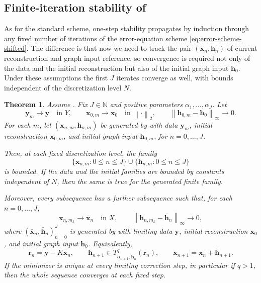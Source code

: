 \documentclass{article}
\newtheorem{theorem}{Theorem}[section]
\theoremstyle{remark}
\newcommand{\N}{\mathbb{N}}
\newcommand{\norm}[1]{\left\lVert #1 \right\rVert}
\newcommand{\bx}{{\bm{x}}}
\newcommand{\by}{{\bm{y}}}
\newcommand{\bh}{{\bm{h}}}
\newcommand{\br}{{\bm{r}}}
\begin{document}
\subsection{Finite-iteration stability of \texorpdfstring{}{the error-equation scheme}}\label{sec:error-finite-stability}
As for the standard scheme, one-step stability propagates by induction through
any fixed number of iterations of the error-equation scheme
\cref{eq:error-scheme-shifted}. The difference is that now we need to track the pair
$(\bx_n,\bh_n)$ of current reconstruction and graph input reference, so convergence is
required not only of the data and the initial reconstruction but also of the
initial graph input $\bh_0$. Under these assumptions the first $J$ iterates
converge as well, with bounds independent of the discretization level $N$.
\begin{theorem}\label{thm:error-finite-stability}
Assume . Fix \(J\in\N\) and positive parameters
\(\alpha_1,\ldots,\alpha_J\). Let
\[
\by_m\to \by \quad\text{in }Y,
\qquad
\bx_{0,m}\to \bx_0 \quad\text{in }\norm{\cdot}_2,
\qquad
\norm{\bh_{0,m}-\bh_0}_\infty\to0 .
\]
For each \(m\), let \((\bx_{n,m},\bh_{n,m})\) be generated by
 with data \(\by_m\), initial reconstruction
\(\bx_{0,m}\), and initial graph input \(\bh_{0,m}\), for
\(n=0,\ldots,J\).

Then, at each fixed discretization level, the family
\[
\{\bx_{n,m}:0\le n\le J\}\cup\{\bh_{n,m}:0\le n\le J\}
\]
is bounded. If the data and the initial families are bounded by constants
independent of \(N\), then the same is true for the generated finite family.

Moreover, every subsequence has a further subsequence such that, for each
\(n=0,\ldots,J\),
\[
\bx_{n,m_k}\to \bar\bx_n \quad\text{in } X,
\qquad
\norm{\bh_{n,m_k}-\bar\bh_n}_\infty\to0,
\]
where \((\bar\bx_n,\bar\bh_n)_{n=0}^J\) is generated by
 with limiting data \(\by\), initial reconstruction
\(\bx_0\), and initial graph input \(\bh_0\). Equivalently,
\[
\bar\br_n=\by-K\bar\bx_n,
\qquad
\bar\bh_{n+1}\in T_{\alpha_{n+1},\bar\bh_n}^q(\bar\br_n),
\qquad
\bar\bx_{n+1}=\bar\bx_n+\bar\bh_{n+1}.
\]
If the minimizer is unique at every limiting correction step, in particular if
\(q>1\), then the whole sequence converges at each fixed step.
\end{theorem}
\end{document}
